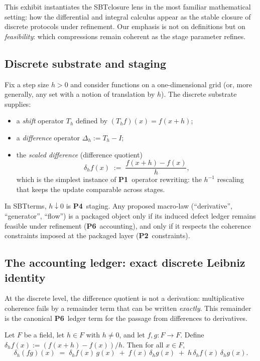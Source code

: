 \documentclass[apajournal,article,submit,moreauthors,pdftex]{Definitions/mdpi}
\newenvironment{lemma}{\begin{Lemma}}{\end{Lemma}}
\newcommand{\SBT}{\textsc{SBT}}
\newcommand{\Pone}{\textbf{P1}}
\newcommand{\Ptwo}{\textbf{P2}}
\newcommand{\Pfour}{\textbf{P4}}
\newcommand{\Psix}{\textbf{P6}}
\begin{document}
This exhibit instantiates the \SBT closure lens in the most familiar mathematical setting:
how the differential and integral calculus appear as the stable closure of discrete protocols under refinement.
Our emphasis is not on definitions but on \emph{feasibility}:
which compressions remain coherent as the stage parameter refines.

\subsection{Discrete substrate and staging}
Fix a step size $h>0$ and consider functions on a one-dimensional grid (or, more generally, any set with a notion of translation by $h$).
The discrete substrate supplies:
\begin{itemize}
  \item a \emph{shift} operator $T_h$ defined by $(T_h f)(x)=f(x+h)$;
  \item a \emph{difference} operator $\Delta_h := T_h-I$;
  \item the \emph{scaled difference} (difference quotient)
  \[
    \delta_h f(x)\;:=\;\frac{f(x+h)-f(x)}{h},
  \]
  which is the simplest instance of \Pone\ operator rewriting: the $h^{-1}$ rescaling that keeps the update comparable across stages.
\end{itemize}

In \SBT terms, $h\downarrow 0$ is \Pfour\ staging.
Any proposed macro-law (``derivative'', ``generator'', ``flow'') is a packaged object only if its induced defect ledger remains feasible under refinement (\Psix\ accounting), and only if it respects the coherence constraints imposed at the packaged layer (\Ptwo\ constraints).

\subsection{The accounting ledger: exact discrete Leibniz identity}
At the discrete level, the difference quotient is not a derivation:
multiplicative coherence fails by a remainder term that can be written \emph{exactly}.
This remainder is the canonical \Psix\ ledger term for the passage from differences to derivatives.

\begin{lemma}[Finite-difference Leibniz identity]\label{lem:finite-diff-leibniz}
Let $F$ be a field, let $h\in F$ with $h\neq 0$, and let $f,g:F\to F$.
Define $\delta_h f(x):=(f(x+h)-f(x))/h$.
Then for all $x\in F$,
\[
\delta_h(fg)(x)
\;=\;
\delta_h f(x)\, g(x)
\;+
\;f(x)\, \delta_h g(x)
\;+
\;h\,\delta_h f(x)\,\delta_h g(x).
\]
\end{lemma}
\end{document}
